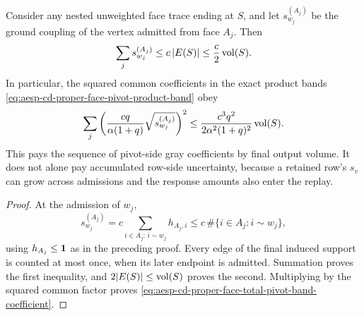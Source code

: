\begin{corollary}
\label{cor:aesp-cd-proper-face-pivot-coupling-budget}
Consider any nested unweighted face trace ending at \(S\), and let
\(s_{w_j}^{(A_j)}\) be the ground coupling of the vertex admitted from face
\(A_j\).  Then
\begin{equation}
 \sum_j s_{w_j}^{(A_j)}
 \leq c\,|E(S)|
 \leq\frac c2\operatorname{vol}(S).
 \label{eq:aesp-cd-proper-face-total-pivot-coupling}
\end{equation}
In particular, the squared common coefficients in the exact product bands
\cref{eq:aesp-cd-proper-face-pivot-product-band} obey
\begin{equation}
 \sum_j
 \left(\frac{cq}{\alpha(1+q)}
       \sqrt{s_{w_j}^{(A_j)}}\right)^2
 \leq
 \frac{c^3q^2}{2\alpha^2(1+q)^2}\operatorname{vol}(S).
 \label{eq:aesp-cd-proper-face-total-pivot-band-coefficient}
\end{equation}
This pays the sequence of pivot-side gray coefficients by final output
volume.  It does not alone pay accumulated row-side uncertainty, because a
retained row's \(s_v\) can grow across admissions and the response amounts
also enter the replay.
\end{corollary}

\begin{proof}
At the admission of \(w_j\),
\begin{equation*}
 s_{w_j}^{(A_j)}
 =c\sum_{i\in A_j:\,i\sim w_j}h_{A_j,i}
 \leq c\,\#\{i\in A_j:i\sim w_j\},
\end{equation*}
using \(h_{A_j}\leq\mathbf{1}\) as in the preceding proof.  Every edge of the final
induced support is counted at most once, when its later endpoint is admitted.
Summation proves the first inequality, and
\(2|E(S)|\leq\operatorname{vol}(S)\) proves the second.  Multiplying by the squared common
factor proves
\cref{eq:aesp-cd-proper-face-total-pivot-band-coefficient}.
\end{proof}

